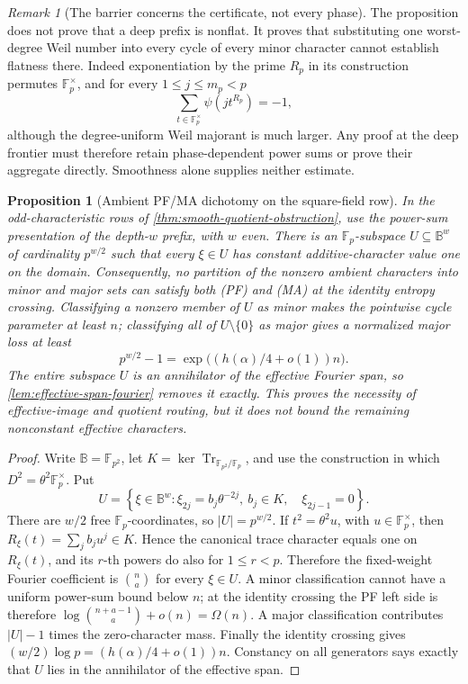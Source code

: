 \documentclass[12pt,a4paper]{amsart}
\numberwithin{equation}{section}
\newtheorem{proposition}[proposition]{Proposition}
\theoremstyle{remark}
\newtheorem{remark}[remark]{Remark}
\DeclareMathOperator{\Tr}{Tr}
\newcommand{\F}{\mathbb F}
\newcommand{\B}{\mathbb B}
\newcommand{\abs}[1]{\lvert #1\rvert}
\begin{document}
\begin{remark}[The barrier concerns the certificate, not every phase]
The proposition does not prove that a deep prefix is nonflat.  It proves
that substituting one worst-degree Weil number into every cycle of every
minor character cannot establish flatness there.  Indeed exponentiation
by the prime \(R_p\) in its construction permutes \(\F_p^\times\), and
for every \(1\le j\le m_p<p\)
\[
        \sum_{t\in\F_p^\times}\psi(jt^{R_p})=-1,
\]
although the degree-uniform Weil majorant is much larger.  Any proof at
the deep frontier must therefore retain phase-dependent power sums or
prove their aggregate directly.  Smoothness alone supplies neither
estimate.
\end{remark}

\begin{proposition}[Ambient PF/MA dichotomy on the square-field row]
\label{prop:pf-ma-square-dichotomy}
In the odd-characteristic rows of
\cref{thm:smooth-quotient-obstruction}, use the power-sum presentation of
the depth-\(w\) prefix, with \(w\) even.  There is an \(\F_p\)-subspace
\(U\subseteq\B^w\) of cardinality \(p^{w/2}\) such that every
\(\xi\in U\) has constant additive-character value one on the domain.
Consequently, no partition of the nonzero \emph{ambient} characters into
minor and major sets can satisfy both \textup{(PF)} and \textup{(MA)} at
the identity entropy crossing.  Classifying a nonzero member of \(U\) as
minor makes the pointwise cycle parameter at least \(n\); classifying all
of \(U\setminus\{0\}\) as major gives a normalized major loss at least
\[
       p^{w/2}-1
       =\exp\bigl((h(\alpha)/4+o(1))n\bigr).         \tag{PFMA}
\]
The entire subspace \(U\) is an annihilator of the effective Fourier span,
so \cref{lem:effective-span-fourier} removes it exactly.  This proves the
necessity of effective-image and quotient routing, but it does not bound
the remaining nonconstant effective characters.
\end{proposition}

\begin{proof}
Write \(\B=\F_{p^2}\), let
\(K=\ker\Tr_{\F_{p^2}/\F_p}\), and use the construction in which
\(D^2=\theta^2\F_p^\times\).  Put
\[
 U=\left\{\xi\in\B^w:
 \xi_{2j}=b_j\theta^{-2j},\ b_j\in K,\quad
 \xi_{2j-1}=0\right\}.
\]
There are \(w/2\) free \(\F_p\)-coordinates, so \(\abs U=p^{w/2}\).
If \(t^2=\theta^2u\), with \(u\in\F_p^\times\), then
\(R_\xi(t)=\sum_jb_ju^j\in K\).  Hence the canonical trace character
equals one on \(R_\xi(t)\), and its \(r\)-th powers do also for
\(1\le r<p\).  Therefore the fixed-weight Fourier coefficient is
\(\binom na\) for every \(\xi\in U\).  A minor classification cannot
have a uniform power-sum bound below \(n\); at the identity crossing the
PF left side is therefore
\(\log\binom{n+a-1}{a}+o(n)=\Omega(n)\).  A major classification
contributes \(\abs U-1\) times the zero-character mass.  Finally the
identity crossing gives
\((w/2)\log p=(h(\alpha)/4+o(1))n\).  Constancy on all generators says
exactly that \(U\) lies in the annihilator of the effective span.
\end{proof}
\end{document}
